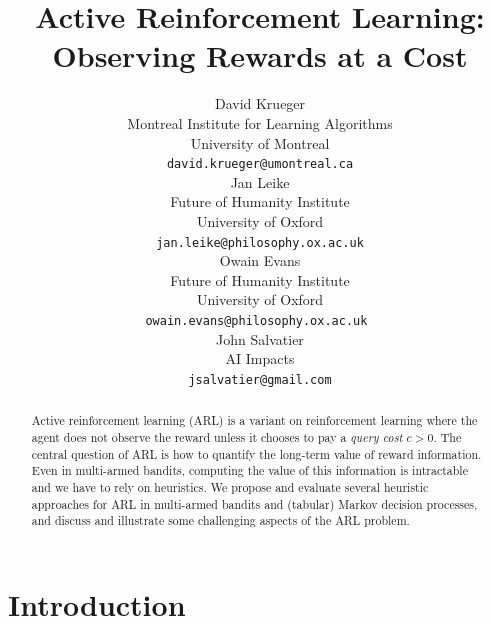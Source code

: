 \documentclass{article}
\title{Active Reinforcement Learning: \\ Observing Rewards at a Cost}
\author{
  David Krueger \\
  Montreal Institute for Learning Algorithms \\
  University of Montreal \\
  \texttt{david.krueger@umontreal.ca} \\
  \And
  Jan Leike \\
  Future of Humanity Institute \\
  University of Oxford \\
  \texttt{jan.leike@philosophy.ox.ac.uk} \\
  \And
  Owain Evans \\
  Future of Humanity Institute \\
  University of Oxford \\
  \texttt{owain.evans@philosophy.ox.ac.uk } \\
  \And
  John Salvatier \\
  AI Impacts \\
  \texttt{jsalvatier@gmail.com} \\
}
\begin{document}
\maketitle

\begin{abstract}
Active reinforcement learning (ARL) is a variant on reinforcement learning
where the agent does not observe the reward unless it chooses to pay
a \emph{query cost} $c > 0$.
The central question of ARL is
how to quantify the long-term value of reward information.
Even in multi-armed bandits, computing the value of this information
is intractable and we have to rely on heuristics.
We propose and evaluate several heuristic approaches for ARL
in multi-armed bandits and (tabular) Markov decision processes,
and discuss and illustrate some challenging aspects of the ARL problem.
\end{abstract}

\section{Introduction}
\end{document}

